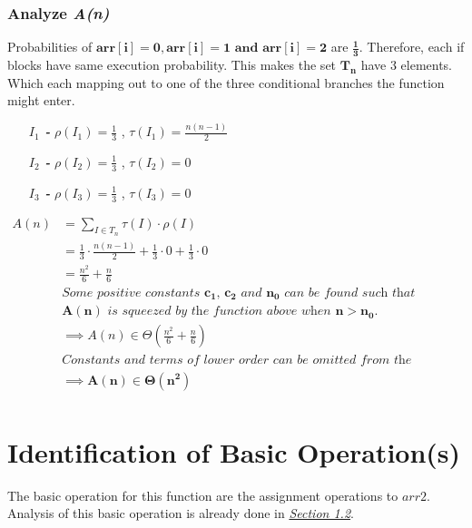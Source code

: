 \documentclass[10pt]{article}
\begin{document}
\subsubsection{Analyze \textit{A(n)}}
Probabilities of $\mathbf{arr[i]=0 ,arr[i]=1 \text { and } arr[i]=2}$ are $\boldsymbol{\frac{1}{3}}$. Therefore, each if blocks have same execution probability. This makes the set $\mathbf{T_{n}}$ have 3 elements. Which each mapping out to one of the three conditional branches the function might enter. 

\begin{enumerate}[leftmargin=2.6cm]
    \item[\textit{\textbf{$I_{1}$ - }}] $\rho (\mathit{I_{1}}) = \frac{1}{3}$ ,  $\tau (\mathit{I_{1}})= \frac{n(n-1)}{2}$
    \item[\textit{\textbf{$I_{2}$ - }}] $\rho (\mathit{I_{2}}) = \frac{1}{3}$ ,  $\tau (\mathit{I_{2}}) = 0$
    \item[\textit{\textbf{$I_{3}$ - }}] $\rho (\mathit{I_{3}}) = \frac{1}{3}$ ,  $\tau (\mathit{I_{3}}) = 0$
\end{enumerate}

\begin{align*}
A(n) &= \displaystyle\sum _{I \in T_{n}} \tau (I) \cdot \rho (I) &&\\
 &= \frac{1}{3} \cdot \frac{n(n-1)}{2} + \frac{1}{3} \cdot 0 + \frac{1}{3} \cdot  0 && \\
 &= \frac{n^2}{6} + \frac{n}{6} && \\ 
 &\textit{Some positive constants $\mathbf{c_{1}}$, $\mathbf{c_{2}}$ and $\mathbf{n_{0}}$ can be found such that} && \\ 
 &\textit{$\mathbf{A(n)}$ is squeezed by the function above when $\mathbf{n > n_{0}}$.} && \\
 &\implies A(n) \in \Theta (\frac{n^2}{6} + \frac{n}{6}) && \\
 &\textit{Constants and terms of lower order can be omitted from the complexity class.} \\
 &\implies \mathbf{A(n) \boldsymbol{\in} \Theta (n^2)} && \\
\end{align*}

\section{Identification of Basic Operation(s)}
\label{sec:ident}
The basic operation for this function are the assignment operations to $arr2$. Analysis of this basic operation is already done in \hyperref[sec:real]{\textit{Section 1.2}}.
\end{document}
